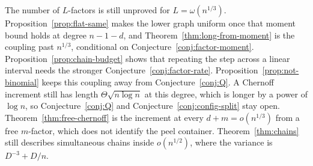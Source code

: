\documentclass[11pt]{article}
\begin{document}
The number of \(L\)-factors is still unproved for \(L=\omega(n^{1/3})\). Proposition~\ref{prop:flat-same} makes the lower graph uniform once that moment bound holds at degree \(n-1-d\), and Theorem~\ref{thm:long-from-moment} is the coupling past \(n^{1/3}\), conditional on Conjecture~\ref{conj:factor-moment}. Proposition~\ref{prop:chain-budget} shows that repeating the step across a linear interval needs the stronger Conjecture~\ref{conj:factor-rate}. Proposition~\ref{prop:not-binomial} keeps this coupling away from Conjecture~\ref{conj:Q}.
A Chernoff increment still has length \(\Theta\sqrt{n\log n}\) at this degree, which is longer by a power of \(\log n\), so Conjecture~\ref{conj:Q} and Conjecture~\ref{conj:config-split} stay open.
Theorem~\ref{thm:free-chernoff} is the increment at every \(d+m=o(n^{1/3})\) from a free \(m\)-factor, which does not identify the peel container.
Theorem~\ref{thm:chains} still describes simultaneous chains inside \(o(n^{1/2})\), where the variance is \(D^{-3}+D/n\).
\end{document}
